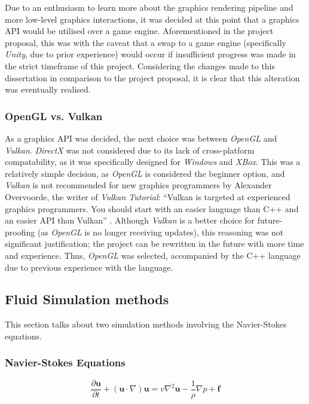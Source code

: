 \documentclass[12pt]{article}
\begin{document}
    Due to an enthusiasm to learn more about the graphics rendering pipeline and more low-level graphics interactions, it was decided at this point that a graphics API would be utilised over a game engine. Aforementioned in the project proposal, this was with the caveat that a swap to a game engine (specifically \textit{Unity}, due to prior experience) would occur if insufficient progress was made in the strict timeframe of this project. Considering the changes made to this dissertation in comparison to the project proposal, it is clear that this alteration was eventually realised.

    \subsubsection{OpenGL vs. Vulkan}

    As a graphics API was decided, the next choice was between \textit{OpenGL} and \textit{Vulkan}. \textit{DirectX} was not considered due to its lack of cross-platform compatability, as it was specifically designed for \textit{Windows} and \textit{XBox}. This was a relatively simple decision, as \textit{OpenGL} is considered the beginner option, and \textit{Vulkan} is not recommended for new graphics programmers by Alexander Overvoorde, the writer of \textit{Vulkan Tutorial}: ``Vulkan is targeted at experienced graphics programmers. You should start with an easier language than C++ and an easier API than Vulkan'' \cite{vulkancomment}. Although \textit{Vulkan} is a better choice for future-proofing (as \textit{OpenGL} is no longer receiving updates), this reasoning was not significant justification; the project can be rewritten in the future with more time and experience. Thus, \textit{OpenGL} was selected, accompanied by the C++ language due to previous experience with the language.
    
    \subsection{Fluid Simulation methods}

    This section talks about two simulation methods involving the Navier-Stokes equations.

    \subsubsection{Navier-Stokes Equations}

    \begin{equation}
        \frac{\partial{\textbf{u}}}{\partial{t}} + (\textbf{u} \cdot\nabla)\textbf{u} = v\nabla^2 \textbf{u} - \frac{1}{\rho}\nabla p + \textbf{f}
    \end{equation}
\end{document}

